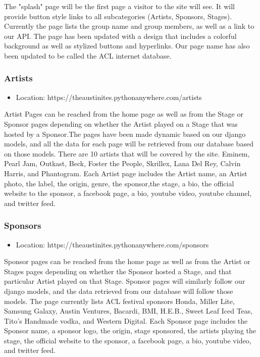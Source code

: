 \documentclass[12pt,english]{scrartcl}
\begin{document}
The "splash" page will be the first page a visitor to the site will see. It will provide button style links to all subcategories (Artists,
Sponsors, Stages). Currently the page lists the group name and group members, as well as a link to our API. The page has been updated with a design that includes a colorful
background as well as stylized buttons and hyperlinks. Our page name has also been updated to be called the ACL internet database.

\subsubsection{Artists}
\begin{itemize}
 \item Location: https://theaustinites.pythonanywhere.com/artists
\end{itemize}

Artist Pages can be reached from the home page as well as from the Stage or Sponsor pages depending on whether the Artist played on
a Stage that was hosted by a Sponsor.The pages have been made dynamic based on our django models, and all the data for each page will be retrieved from our database based on those 
models. There are 10 artists that will be covered by the site. Eminem, Pearl Jam, Outkast, Beck, Foster the People, Skrillex, Lana Del Rey, Calvin Harris, and Phantogram. Each Artist page 
includes the Artist name, an Artist photo, the label, the origin, genre, the sponsor,the stage, a bio, the official website to the sponsor, a facebook page, a bio, youtube video, 
youtube channel, and twitter feed. 

\subsubsection{Sponsors}
\begin{itemize}
 \item Location: https://theaustinites.pythonanywhere.com/sponsors
\end{itemize}

Sponsor pages can be reached from the home page as well as from the Artist or Stages pages depending on whether the Sponsor hosted a
Stage, and that particular Artist played on that Stage. Sponsor pages will similarly follow our django models, and the data retrieved from our database will follow those models. The 
page currently lists ACL festival sponsors Honda, Miller Lite, Samsung Galaxy, Austin Ventures, Bacardi, BMI, H.E.B., Sweet Leaf Iced Teas, Tito's Handmade vodka, and Western Digital. 
Each Sponsor page includes the Sponsor name, a sponsor logo, the origin, stage sponsored, the artists playing the stage, the official website to the sponsor, a facebook page, a bio, 
youtube video, and twitter feed.
\end{document}
